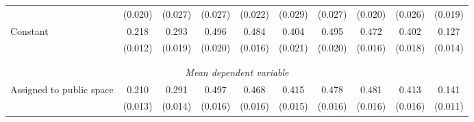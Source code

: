 \begin{tabular}{l*{9}{c}}
                    &     (0.020)         &     (0.027)         &     (0.027)         &     (0.022)         &     (0.029)         &     (0.027)         &     (0.020)         &     (0.026)         &     (0.019)         \\
[1em]
Constant            &       0.218\sym{***}&       0.293\sym{***}&       0.496\sym{***}&       0.484\sym{***}&       0.404\sym{***}&       0.495\sym{***}&       0.472\sym{***}&       0.402\sym{***}&       0.127\sym{***}\\
                    &     (0.012)         &     (0.019)         &     (0.020)         &     (0.016)         &     (0.021)         &     (0.020)         &     (0.016)         &     (0.018)         &     (0.014)         \\
\\[-1.8ex] \hline \\[-1.8ex]  
\multicolumn{10}{c}{\textit{Mean dependent variable}} \\ Assigned to public space&       0.210         &       0.291         &       0.497         &       0.468         &       0.415         &       0.478         &       0.481         &       0.413         &       0.141         \\
\,                  &     (0.013)         &     (0.014)         &     (0.016)         &     (0.016)         &     (0.015)         &     (0.016)         &     (0.016)         &     (0.016)         &     (0.011)         \\


\end{tabular}
